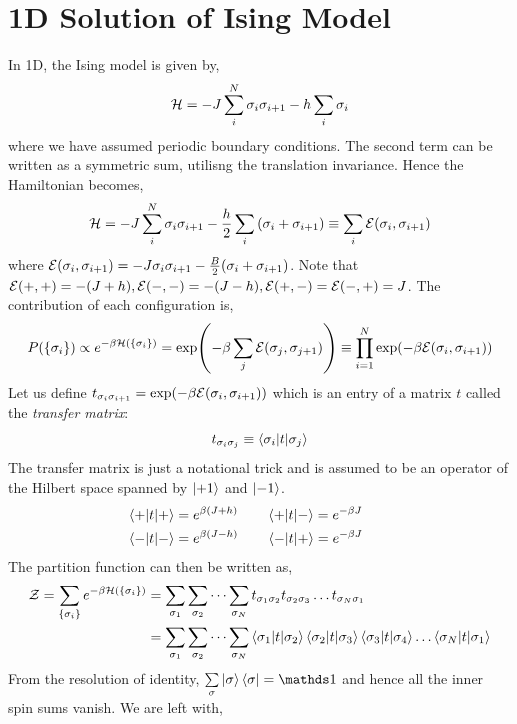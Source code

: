 \section{1D Solution of Ising Model}
\label{append:ising1d}
In 1D, the Ising model is given by,
$$\mathcal H =-J \sum\limits_{i}^N \sigma_i \sigma_{i+1} -h\sum\limits_i\sigma_i$$
where we have assumed periodic boundary conditions. The second term can be written as a symmetric sum, utilisng the translation invariance. Hence the Hamiltonian becomes,
\begin{align*}
    \mathcal H = -J \sum\limits_{i}^N \sigma_i \sigma_{i+1} -\frac{h}{2}\sum\limits_i\qty(\sigma_i+\sigma_{i+1})\equiv \sum\limits_i \mathcal{E}(\sigma_i, \sigma_{i+1})
\end{align*}
where $\mathcal E(\sigma_i, \sigma_{i+1}) = -J\sigma_i \sigma_{i+1} - \frac{B}{2}(\sigma_i + \sigma_{i+1})$. Note that $\mathcal E(+,+) = -(J+h), \mathcal E(-,-)= -(J-h), \mathcal E(+,-) = \mathcal E(-,+) = J$. The contribution of each configuration is, 
$$P(\{\sigma_i\}) \propto e^{-\beta\mathcal H(\{\sigma_i\})} = \exp(-\beta\sum_j\mathcal E(\sigma_j, \sigma_{j+1})) \equiv \prod\limits_{i=1}^N \exp(-\beta\mathcal E(\sigma_i, \sigma_{i+1}))$$
Let us define $t_{\sigma_i \sigma_{i+1}} = \exp(-\beta\mathcal E(\sigma_i, \sigma_{i+1}))$ which is an entry of a matrix $t$ called the \textit{transfer matrix}:
$$t_{\sigma_{i}\sigma_{j}} \equiv \braket{\sigma_i|t|\sigma_j}$$
The transfer matrix is just a notational trick and is assumed to be an operator of the Hilbert space spanned by $\ket{+1}$ and $\ket{-1}$. 
\begin{align*}
    \braket{+|t|+} &=e^{\beta(J+h)} \qquad \braket{+|t|-} = e^{-\beta J}\\
    \braket{-|t|-} &= e^{\beta(J-h)} \qquad \braket{-|t|+} = e^{-\beta J}\qquad 
\end{align*}
The partition function can then be written as,
\begin{align}
    \begin{split}
        \mathcal Z = \sum_{\{\sigma_i\}} e^{-\beta \mathcal H(\{\sigma_i\})} &=\sum_{\sigma_1}\sum_{\sigma_2}\cdots \sum_{\sigma_N} t_{\sigma_1\sigma_2}t_{\sigma_2\sigma_3}\ldots t_{\sigma_N\sigma_1}\\
        &=\sum_{\sigma_1}\sum_{\sigma_2}\cdots \sum_{\sigma_N} \braket{\sigma_1|t|\sigma_2}\braket{\sigma_2|t|\sigma_3}\braket{\sigma_3|t|\sigma_4}\ldots \braket{\sigma_N|t|\sigma_1}\\
    \end{split}
\end{align}
From the resolution of identity, $\sum\limits_{\sigma}\ket{\sigma}\bra{\sigma}=\iden$ and hence all the inner spin sums vanish. We are left with,
